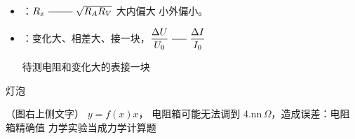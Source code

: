 \begin{itemize}
\item {}：$R_x\ \rule[0.5ex]{2.5em}{0.4pt}\ \sqrt{R_AR_V}$ \quad 大内偏大 \quad 小外偏小。
\item {}：变化大、相差大、接一块，$\dfrac{\Delta U}{U_0}\ \rule[0.5ex]{1.5em}{0.4pt}\ \dfrac{\Delta I}{I_0}$

待测电阻和变化大的表接一块
\end{itemize}
灯泡


（图右上侧文字） $y=f(x)x$，
电阻箱可能无法调到 4.nn$\,\Omega$，造成误差：电阻箱精确值
力学实验当成力学计算题
